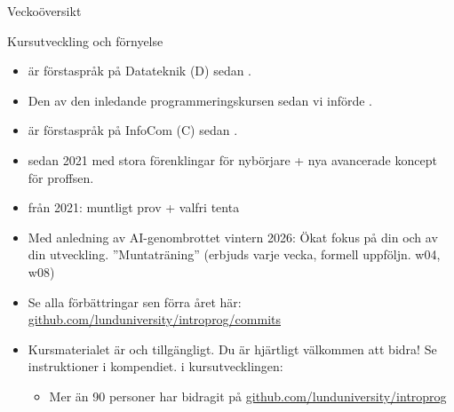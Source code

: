 \ifkompendium\else

\begin{SlideExtra}{Veckoöversikt}
  \noindent\resizebox{0.9\columnwidth}{!}{
  
  }
\end{SlideExtra}
  
\begin{SlideExtra}{Kursutveckling och förnyelse}\SlideFontSmall
\begin{itemize}
\item {} är förstaspråk på Datateknik (D) sedan .
\item[] Den  av den inledande programmeringskursen sedan vi införde .
\item {} är förstaspråk på InfoCom (C) sedan .
\item {} sedan 2021 med stora förenklingar för nybörjare + nya avancerade koncept för proffsen.
\item {} från 2021: muntligt prov + valfri tenta
\item Med anledning av AI-genombrottet vintern 2026: Ökat fokus på din  och  av din utveckling. ''Muntaträning'' (erbjuds varje vecka, formell uppföljn. w04, w08)
\item Se alla förbättringar sen förra året här: \href{https://github.com/lunduniversity/introprog/commits}{github.com/lunduniversity/introprog/commits}
\item Kursmaterialet är  och  tillgängligt. Du är hjärtligt välkommen att bidra! Se instruktioner i kompendiet.  i kursutvecklingen:
\begin{itemize}\SlideFontTiny
\item Mer än 90 personer har bidragit på \href{https://github.com/lunduniversity/introprog}{github.com/lunduniversity/introprog}
\end{itemize}
\end{itemize}
\end{SlideExtra}

